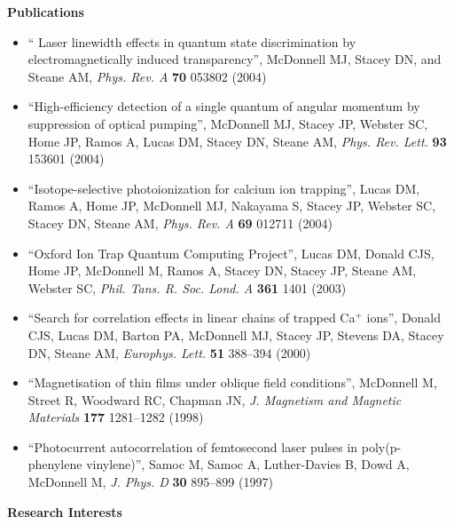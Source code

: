 \documentclass[11pt,a4paper]{article}
\begin{document}
%
%
%
%
{\large \textbf{Publications}}
\begin{itemize}
  \item `` Laser linewidth effects in quantum state discrimination by
    electromagnetically induced transparency'',  McDonnell MJ,
    Stacey DN, and Steane AM, \textit{Phys. Rev. A} \textbf{70}
    053802 (2004) 
  \item ``High-efficiency detection of a single quantum of angular
    momentum by suppression of optical pumping'',  McDonnell MJ,
    Stacey JP, Webster SC, Home JP, Ramos A, Lucas DM, Stacey DN,
    Steane AM, 
    \textit{Phys. Rev. Lett.} \textbf{93} 153601 (2004)
  \item ``Isotope-selective photoionization for calcium ion
    trapping'', Lucas DM, Ramos A, Home JP, McDonnell MJ, Nakayama S,
    Stacey JP, Webster SC, Stacey DN, Steane AM,
    \textit{Phys. Rev. A} \textbf{69} 012711 (2004)
  \item ``Oxford Ion Trap Quantum Computing Project'', Lucas DM, Donald CJS,
    Home JP, McDonnell M, Ramos A, Stacey DN, Stacey JP, Steane AM,
    Webster SC, \textit{Phil. Tans. R. Soc. Lond. A} \textbf{361} 1401
    (2003)
  \item ``Search for correlation effects in linear chains of trapped
    Ca$^{+}$ ions'', Donald CJS, Lucas DM, Barton PA, McDonnell MJ,
    Stacey JP, Stevens DA, Stacey DN, Steane AM,
    \textit{Europhys. Lett.} \textbf{51} 388--394 (2000)
  \item ``Magnetisation of thin films under oblique field
    conditions'', McDonnell M, Street R, Woodward RC, Chapman JN,
    \textit{J. Magnetism and Magnetic Materials} \textbf{177}
    1281--1282 (1998)
  \item ``Photocurrent autocorrelation of femtosecond laser pulses in
    poly(p-phenylene vinylene)'', Samoc M, Samoc A, Luther-Davies B,
    Dowd A, McDonnell M, \textit{J. Phys. D} \textbf{30} 895--899 (1997)
\end{itemize}
%
%
{\large \textbf{Research Interests}}
\end{document}
